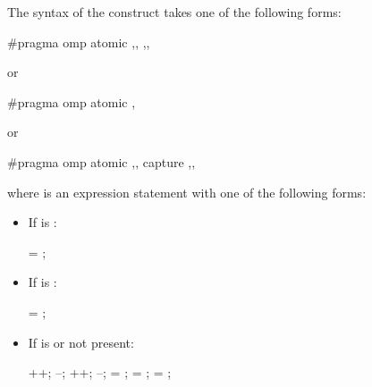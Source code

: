 \begin{ccppspecific}
The syntax of the  construct takes one of the following forms:

\begin{ompcPragma}
#pragma omp atomic \plc{[clause[[[},\plc{] clause] ... ] [},\plc{]]} 
                   \plc{[[},\plc{] clause [[[},\plc{] clause] ... ]]} 
\end{ompcPragma}


or

\begin{ompcPragma}
#pragma omp atomic \plc{[clause[[},\plc{] clause] ... ]} 
\end{ompcPragma}

or

\begin{ompcPragma}
#pragma omp atomic \plc{[clause[[[},\plc{] clause] ... ] [},\plc{]]} capture
                   \plc{[[},\plc{] clause [[[},\plc{] clause] ... ]]} 
\end{ompcPragma}

where  is an expression statement with one of the following forms:

\begin{itemize}
\item If  is :
\begin{ompSyntax}
 = ;
\end{ompSyntax}


\item If  is :
\begin{ompSyntax}
 = ;
\end{ompSyntax}

\item If  is  or not present:
\begin{ompSyntax}
++;
--;
++;
--;
 = ;
 =   ;
 =   ;
\end{ompSyntax}


\end{itemize}
\end{ccppspecific}
